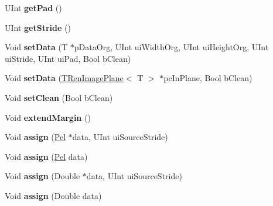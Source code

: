 \begin{DoxyCompactItemize}
\mbox{\label{class_t_ren_image_plane_a042803c997828a850667e35a7bcfa004}} 
U\+Int {\bfseries get\+Pad} ()
\item 
\mbox{\label{class_t_ren_image_plane_a2c799dfc7ca951fac9cdc61b9433e4eb}} 
U\+Int {\bfseries get\+Stride} ()
\item 
\mbox{\label{class_t_ren_image_plane_accbdc26f9b0c85acfb29cd314bcd58e5}} 
Void {\bfseries set\+Data} (T $\ast$p\+Data\+Org, U\+Int ui\+Width\+Org, U\+Int ui\+Height\+Org, U\+Int ui\+Stride, U\+Int ui\+Pad, Bool b\+Clean)
\item 
\mbox{\label{class_t_ren_image_plane_a7c9f94561f3788f7a2f110877f270c08}} 
Void {\bfseries set\+Data} (\hyperlink{class_t_ren_image_plane}{T\+Ren\+Image\+Plane}$<$ T $>$ $\ast$pc\+In\+Plane, Bool b\+Clean)
\item 
\mbox{\label{class_t_ren_image_plane_ae4c9b15d7aa3a79c5f3cea1c9ee9bfef}} 
Void {\bfseries set\+Clean} (Bool b\+Clean)
\item 
\mbox{\label{class_t_ren_image_plane_a620f359c64e2cbf4269a1ae90fe1e09e}} 
Void {\bfseries extend\+Margin} ()
\item 
\mbox{\label{class_t_ren_image_plane_ac3feb86ff446ea351214f91bf4c26422}} 
Void {\bfseries assign} (\hyperlink{_type_def_8h_af92141699657699b4b547be0c8517541}{Pel} $\ast$data, U\+Int ui\+Source\+Stride)
\item 
\mbox{\label{class_t_ren_image_plane_a3a4949388a49af5558e15011ecfdae72}} 
Void {\bfseries assign} (\hyperlink{_type_def_8h_af92141699657699b4b547be0c8517541}{Pel} data)
\item 
\mbox{\label{class_t_ren_image_plane_a7402f7dd06a24e9aeb57e4d1468184ae}} 
Void {\bfseries assign} (Double $\ast$data, U\+Int ui\+Source\+Stride)
\item 
\mbox{\label{class_t_ren_image_plane_a13affbe541996f0ad3101b4af8b1d739}} 
Void {\bfseries assign} (Double data)

\end{DoxyCompactItemize}
